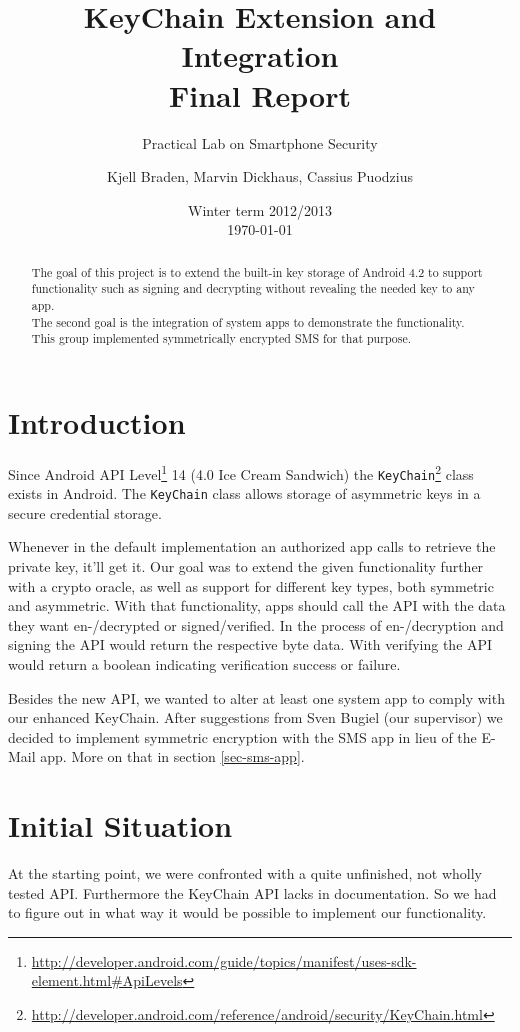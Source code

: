 \documentclass[a4paper,draft]{scrartcl}
\title{KeyChain Extension and Integration\\
	Final Report}
\subtitle{Practical Lab on Smartphone Security}
\author{Kjell Braden, Marvin Dickhaus, Cassius Puodzius}
\date{Winter term 2012/2013\\\today}
\begin{document}
\maketitle

\begin{abstract}
	The goal of this project is to extend the built-in key storage of Android 4.2 to support functionality such as signing and decrypting without revealing the needed key to any app.\\
	The second goal is the integration of system apps to demonstrate the functionality. This group implemented symmetrically encrypted SMS for that purpose.
\end{abstract}

\tableofcontents


\section{Introduction}
	Since Android API Level\footnote{\url{http://developer.android.com/guide/topics/manifest/uses-sdk-element.html\#ApiLevels}} 14 (4.0 Ice Cream Sandwich) the \texttt{KeyChain}\footnote{\url{http://developer.android.com/reference/android/security/KeyChain.html}} class exists in Android. The \texttt{KeyChain} class allows storage of asymmetric keys in a secure credential storage.

	Whenever in the default implementation an authorized app calls to retrieve the private key, it'll get it. Our goal was to extend the given functionality further with a crypto oracle, as well as support for different key types, both symmetric and asymmetric. With that functionality, apps should call the API with the data they want en-/decrypted or signed/verified. In the process of en-/decryption and signing the API would return the respective byte data. With verifying the API would return a boolean indicating verification success or failure.
	
	Besides the new API, we wanted to alter at least one system app to comply with our enhanced KeyChain. After suggestions from Sven Bugiel (our supervisor) we decided to implement symmetric encryption with the SMS app in lieu of the E-Mail app. More on that in section \ref{sec-sms-app}.

\section{Initial Situation}
	At the starting point, we were confronted with a quite unfinished, not wholly tested API. Furthermore the KeyChain API lacks in documentation. So we had to figure out in what way it would be possible to implement our functionality.
\end{document}
